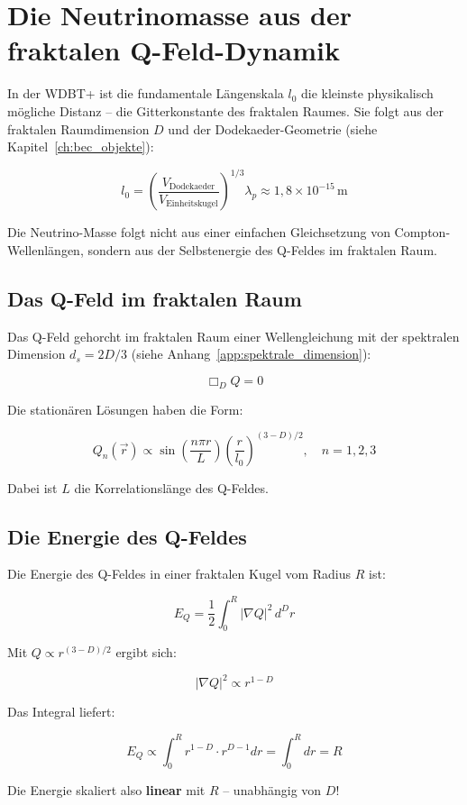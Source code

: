 \section{Die Neutrinomasse aus der fraktalen Q-Feld-Dynamik}
\label{sec:nu_masse}

In der WDBT+ ist die fundamentale Längenskala \( l_0 \) die kleinste physikalisch mögliche Distanz – die Gitterkonstante des fraktalen Raumes. Sie folgt aus der fraktalen Raumdimension \( D \) und der Dodekaeder-Geometrie (siehe Kapitel~\ref{ch:bec_objekte}):

\[
l_0 = \left( \frac{V_{\text{Dodekaeder}}}{V_{\text{Einheitskugel}}} \right)^{1/3} \lambda_p \approx 1,8 \times 10^{-15} \, \text{m}
\]

Die Neutrino-Masse folgt nicht aus einer einfachen Gleichsetzung von Compton-Wellenlängen, sondern aus der Selbstenergie des Q-Feldes im fraktalen Raum.

\subsection{Das Q-Feld im fraktalen Raum}

Das Q-Feld gehorcht im fraktalen Raum einer Wellengleichung mit der spektralen Dimension \( d_s = 2D/3 \) (siehe Anhang~\ref{app:spektrale_dimension}):

\[
\Box_D Q = 0
\]

Die stationären Lösungen haben die Form:

\[
Q_n(\vec{r}) \propto \sin\left(\frac{n\pi r}{L}\right) \left(\frac{r}{l_0}\right)^{(3-D)/2}, \quad n = 1,2,3
\]

Dabei ist \( L \) die Korrelationslänge des Q-Feldes.

\subsection{Die Energie des Q-Feldes}

Die Energie des Q-Feldes in einer fraktalen Kugel vom Radius \( R \) ist:

\[
E_Q = \frac{1}{2} \int_0^R |\nabla Q|^2 \, d^D r
\]

Mit \( Q \propto r^{(3-D)/2} \) ergibt sich:

\[
|\nabla Q|^2 \propto r^{1-D}
\]

Das Integral liefert:

\[
E_Q \propto \int_0^R r^{1-D} \cdot r^{D-1} dr = \int_0^R dr = R
\]

Die Energie skaliert also \textbf{linear} mit \( R \) – unabhängig von \( D \)!

